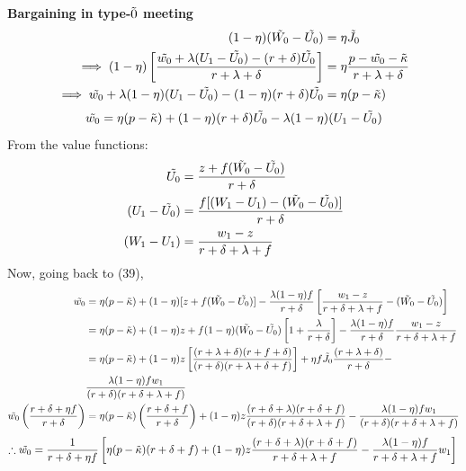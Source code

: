 \documentclass[12pt]{article} %
\theoremstyle{definition}
\begin{document}
\textbf{Bargaining in type-$\Tilde{0}$ meeting}
\begin{align*}
    (1-\eta)(\Tilde{W_0}-\Tilde{U_0}) &= \eta \Tilde{J_0} \\
     \implies (1-\eta) \left[ \frac{\Tilde{w_0} + \lambda(U_1 - \Tilde{U_0}) - (r+\delta)\Tilde{U_0}}{r+\lambda+\delta}\right] &= \eta \frac{p-\Tilde{w_0}-\Tilde{\kappa}}{r+\lambda+ \delta}   \\
    \implies \Tilde{w_0} +  \lambda (1-\eta)(U_1 - \Tilde{U_0}) - (1-\eta)(r+\delta) \Tilde{U_0} &= \eta (p-\Tilde{\kappa}) 
\end{align*}
\begin{equation}
    \Tilde{w_0} = \eta (p-\Tilde{\kappa})+ (1-\eta)(r+\delta) \Tilde{U_0} - \lambda (1-\eta)(U_1 - \Tilde{U_0}) 
\end{equation}
From the value functions:
\begin{align*}
    \Tilde{U_0} &= \frac{z + f (\Tilde{W_0}-\Tilde{U_0})}{r+\delta} \\
    (U_1-\Tilde{U_0}) &= \frac{f[(W_1-U_1) -(\Tilde{W_0}-\Tilde{U_0})]}{r+\delta} \\
    (W_1-U_1) &= \frac{w_1-z}{r+\delta+\lambda+f} 
\end{align*}
Now, going back to (39),
\begin{align*}
     \Tilde{w_0} &= \eta(p-\Tilde{\kappa}) + (1-\eta)[z + f(\Tilde{W_0}-\Tilde{U_0})] - \frac{\lambda (1-\eta)f}{r+\delta}\left[\frac{w_1-z}{r+\delta+\lambda+f}  -(\Tilde{W_0}-\Tilde{U_0})\right] \\
     &= \eta(p-\Tilde{\kappa}) + (1-\eta)z + f(1-\eta)(\Tilde{W_0}-\Tilde{U_0})\left[1+\frac{\lambda}{r+\delta}\right] - \frac{\lambda (1-\eta)f}{r+\delta}\frac{w_1-z}{r+\delta+\lambda+f}\\
     &= \eta(p-\Tilde{\kappa}) + (1-\eta)z\left[\frac{(r+\lambda+\delta)(r+f+\delta)}{(r+\delta)(r+\lambda+\delta+f)}\right] + \eta f \Tilde{J_0} \frac{(r+\lambda+\delta)}{r+\delta} - \\ & \frac{\lambda (1-\eta)f w_1}{(r+\delta)(r+\delta+\lambda+f)}\\
    \Tilde{w_0}\left(\frac{r+\delta+\eta f}{r+\delta}\right) &= \eta(p-\Tilde{\kappa}) \left(\frac{r+\delta+f}{r+\delta}\right) + (1-\eta)z\frac{(r+\delta+\lambda)(r+\delta+f)}{(r+\delta)(r+\delta+\lambda+f)}-\frac{\lambda(1-\eta)fw_1}{(r+\delta)(r+\delta+\lambda+f)}
\end{align*}
\begin{equation}
    \therefore \Tilde{w_0} = \frac{1}{r+\delta+\eta f}\left[\eta(p-\Tilde{\kappa})(r+\delta+f)+(1-\eta)z\frac{(r+\delta+\lambda)(r+\delta+f)}{r+\delta+\lambda+f} - \frac{\lambda(1-\eta)f}{r+\delta+\lambda+f}w_1 \right]\\
\end{equation}
\end{document}

